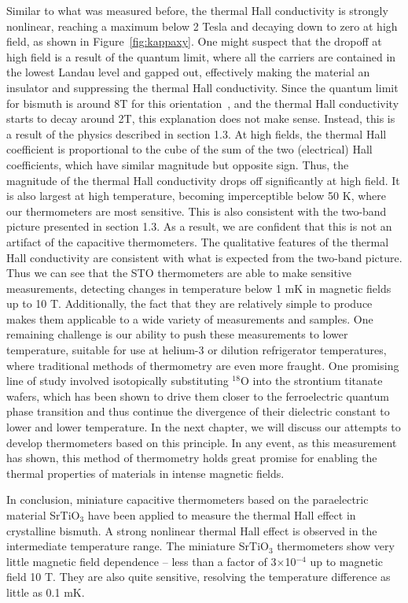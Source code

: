 \documentclass{thesis-umich}
\begin{document}
Similar to what was measured before\cite{Kobayashi2012}, the thermal Hall
conductivity is strongly nonlinear, reaching a maximum below 2 Tesla and
decaying down to zero at high field, as shown in Figure~\ref{fig:kappaxy}. One might suspect that the dropoff at high field is a result of the quantum limit, where all the carriers are contained in the lowest Landau level and gapped out, effectively making the material an insulator and suppressing the thermal Hall conductivity. Since the quantum limit for bismuth is around 8T for this orientation~\cite{Li2008}, and the thermal Hall conductivity starts to decay around 2T, this explanation does not make sense. Instead, this is a result of the physics described in section 1.3. At high fields, the thermal Hall coefficient is proportional to the cube of the sum of the two (electrical) Hall coefficients, which have similar magnitude but opposite sign. Thus, the magnitude of the thermal Hall conductivity drops off significantly at high field.
It is also largest at high temperature, becoming imperceptible below 50 K, where our
thermometers are most sensitive. This is also consistent with the two-band picture presented in section 1.3. As a result, we are confident that this is not
an artifact of the capacitive thermometers. The qualitative features of the thermal Hall conductivity are consistent with what is expected from the two-band picture. Thus we can see that the STO
thermometers are able to make sensitive measurements, detecting changes in
temperature below 1 mK in magnetic fields up to 10 T. Additionally, the fact
that they are relatively simple to produce makes them applicable to a wide
variety of measurements and samples. One remaining challenge is our ability to
push these measurements to lower temperature, suitable for use at helium-3 or
dilution refrigerator temperatures, where traditional methods of thermometry are
even more fraught\cite{Heine1998, Goodrich1998}. One promising line of study
involved isotopically substituting $^{18}$O into the strontium titanate wafers,
which has been shown\cite{Rowley2014} to drive them closer to the ferroelectric
quantum phase transition and thus continue the divergence of their dielectric
constant to lower and lower temperature. In the next chapter, we will discuss our attempts to develop thermometers based on this principle. In any event, as this measurement has
shown, this method of thermometry holds great promise for enabling the thermal
properties of materials in intense magnetic fields.

In conclusion, miniature capacitive thermometers based on the paraelectric
material SrTiO$_3$ have been applied to measure the thermal Hall effect in
crystalline bismuth. A strong nonlinear thermal Hall effect is observed in the
intermediate temperature range. The miniature SrTiO$_3$ thermometers show very
little magnetic field dependence -- less than a factor of 3$\times$10$^{-4}$ up
to magnetic field 10 T. They are also quite sensitive, resolving the temperature
difference as little as 0.1 mK.
\end{document}
